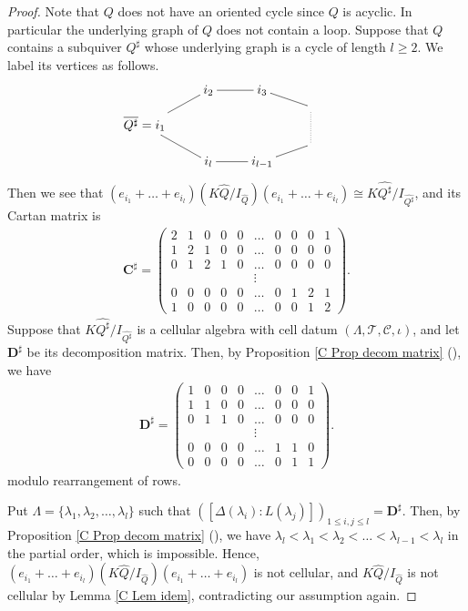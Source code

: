 \documentclass[12pt]{amsart}
\numberwithin{equation}{thm}
\newcommand\bC{\mathbf C}
\newcommand\bD{\mathbf D}
\newcommand\cC{\mathcal{C}}
\newcommand\cT{\mathcal{T}}
\newcommand\la{\lambda}
\newcommand\D{\Delta}
\newcommand\vL{\varLambda}
\newcommand\wh{\widehat}
\newcommand\ol{\overline}
\newcounter{ichi}
\newcommand{\roi}{\roman{ichi}}
\newcounter{san}
\newcommand{\roiii}{\roman{san}}
\begin{document}
\begin{proof}
Note that $Q$ does not have an oriented cycle since $Q$ is acyclic. In particular 
the underlying graph of $Q$ does not contain a loop.
Suppose that $Q$ contains a subquiver $Q^{\sharp}$ 
whose underlying graph is a cycle of length $l\ge2$. We label its vertices as follows. 
\begin{align*}
\xymatrix@R=3pt{
&i_2 \ar@{-}[r] & i_3 \ar@{-}[dr]  &
\\
&&& \ar@{.}[dd]
\\
\ol{Q^{\sharp}} = i_1\ar@{-}[uur] &&& & 
\\
&&& \ar@{-}[dl]
\\
& i_l \ar@{-}[uul]& i_{l-1} \ar@{-}[l] &
}
\end{align*}
Then we see that 
$(e_{i_1} + \dots + e_{i_l}) (K\wh{Q}/ I_{\wh{Q}}) (e_{i_1} + \dots + e_{i_l}) 
	\cong K \wh{Q^{\sharp}}/ I_{\wh{Q^{\sharp}}}$, 
and its Cartan matrix is 
\begin{align*}
\bC^{\sharp} = 
	\begin{pmatrix} 
	2 & 1 & 0 & 0 & 0 & \dots & 0 & 0 & 0 & 1 
	\\ 
	1 & 2 & 1 & 0 & 0 & \dots & 0 & 0 & 0 & 0 
	\\
	0 & 1 & 2 & 1 & 0 & \dots & 0 & 0 & 0 & 0 
	\\
	&&&&& \vdots &&&&
	\\
	0 & 0 & 0 & 0 & 0 & \dots & 0 & 1 & 2 & 1
	\\
	1 & 0 & 0 & 0 & 0 & \dots & 0 & 0 & 1 & 2
	\end{pmatrix}. 
\end{align*}
Suppose that $K \wh{Q^{\sharp}}/ I_{\wh{Q^{\sharp}}}$ is a cellular algebra with cell datum $(\vL,\cT, \cC, \iota)$,  
and let $\bD^{\sharp}$ be its decomposition matrix. 
Then, by Proposition \ref{C Prop decom matrix} (\roiii), 
we have 
\begin{align*}
\bD^{\sharp} = 
	\begin{pmatrix} 
	1 & 0 & 0 & 0 & \dots & 0 & 0 & 1 
	\\
	1 & 1 & 0 & 0 & \dots & 0 & 0 & 0 
	\\
	0 & 1 & 1 & 0 & \dots & 0 & 0 & 0 
	\\
	&&&& \vdots &&&
        \\
        0 & 0 & 0 & 0 & \dots & 1 & 1 & 0
	\\
	0 & 0 & 0 & 0 & \dots & 0 & 1 & 1 
	\end{pmatrix}. 
\end{align*}
modulo rearrangement of rows.

Put $\vL =\{ \la_1, \la_2,\dots, \la_{l}\}$
such that $([\D(\la_i) : L(\la_j)])_{1\leq i,j \leq l} = \bD^{\sharp}$.  
Then, by Proposition \ref{C Prop decom matrix} (\roi), 
we have 
$\la_l < \la_1 < \la_2 < \dots < \la_{l-1} < \la_l$ in the partial order, which is impossible. Hence, 
$(e_{i_1} + \dots + e_{i_l}) (K\wh{Q}/ I_{\wh{Q}}) (e_{i_1} + \dots + e_{i_l})$ 
is not cellular, and 
$K \wh{Q}/ I_{\wh{Q}}$ is not cellular by Lemma \ref{C Lem idem}, contradicting our assumption again.   


\end{proof}
\end{document}
